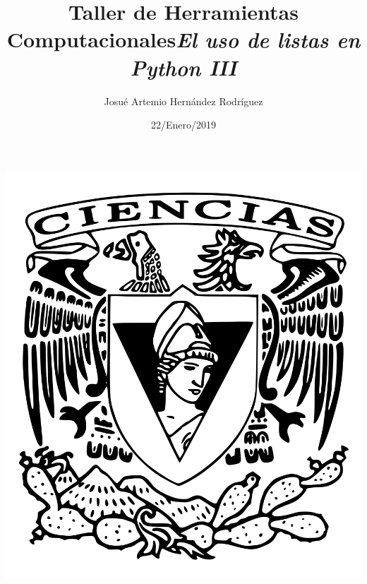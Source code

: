 \documentclass[letterpaper, 12pt,oneside]{article}
\title{\Huge Taller de Herramientas Computacionales}
\author{Josué Artemio Hernández Rodríguez}
\date{22/Enero/2019}
\begin{document}
	\maketitle
	\begin{center}
		\includegraphics[scale=0.2]{2.png}
	\end{center}

	\newpage
	
	\title{\huge \textit{El uso de listas en Python III}}\\
	
\end{document}
